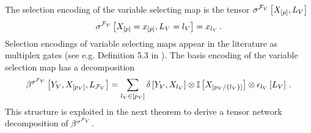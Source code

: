 The selection encoding of the variable selecting map is the tensor $\sigma^{\mathcal{F}_{V}}\left[X_{[p]},L_{V}\right]$
\begin{align*}
    \sigma^{\mathcal{F}_{V}}\left[X_{[p]}=x_{[p]},L_{V}=l_{V}\right] = x_{l_{V}} \, .
\end{align*}
Selection encodings of variable selecting maps appear in the literature as multiplex gates (see e.g. Definition 5.3 in \cite{koller_probabilistic_2009}).
The basis encoding of the variable selection map has a decomposition
\begin{align*}
    \beta^{\sigma^{\mathcal{F}_{V}}}\left[Y_{V},X_{[p_{V}]},L_{\mathcal{F}_{V}}\right]
    = \sum_{l_{V}\in[p_{V}]}
    \delta\left[Y_{V},X_{l_{V}}\right]
    \otimes \mathbb{I}\left[X_{[p_{V}/\{l_{V}\}]}\right]
    \otimes \epsilon_{l_{V}}\left[L_{V}\right] \, .
\end{align*}
This structure is exploited in the next theorem to derive a tensor network decomposition of $\beta^{\sigma^{\mathcal{F}_{V}}}$.

